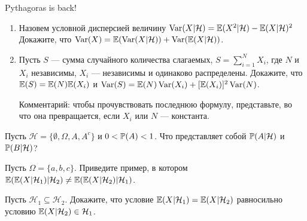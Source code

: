 \begin{problem}
 Pythagoras is back!

\begin{enumerate}
\item  Назовем условной дисперсией величину
$\Var(X|\mathcal{H})=\E(X^{2}|\mathcal{H})-\E(X|\mathcal{H})^{2}$ \\
Докажите, что
$\Var(X)=\E(\Var(X|\mathcal{H}))+\Var(\E(X|\mathcal{H}))$.
\item Пусть $S$ — сумма случайного количества слагаемых,
$S=\sum_{i=1}^{N}X_{i}$, где $N$ и $X_{i}$ независимы, $X_{i}$ — независимы и одинаково распределены.
Докажите, что $\E(S)=\E(N)\E(X_{i})$ и
$\Var(S)=\E(N)\Var(X_{i})+[\E(X_{i})]^{2}\Var(N)$.

Комментарий: чтобы прочувствовать последнюю формулу, представьте,
во что она превращается, если $X_{i}$ или $N$ — константа.
\end{enumerate}


\begin{sol}

\end{sol}
\end{problem}

\begin{problem}
Пусть $\mathcal{H}=\{\emptyset,\Omega,A,A^{c}\}$ и $0<\P(A)<1$. Что
представляет собой $\P(A|\mathcal{H})$ и $\P(B|\mathcal{H})$?

\begin{sol}

\end{sol}
\end{problem}

\begin{problem}
Пусть $\Omega=\{a,b,c\}$. Приведите пример, в котором
$\E(\E(X|\mathcal{H}_{1})|\mathcal{H}_{2})\neq
\E(\E(X|\mathcal{H}_{2})|\mathcal{H}_{1})$.

\begin{sol}

\end{sol}
\end{problem}

\begin{problem}
Пусть $\mathcal{H}_{1} \subseteq \mathcal{H}_{2}$. Докажите, что
условие $\E(X|\mathcal{H}_{1})=\E(X|\mathcal{H}_{2})$ равносильно
условию $\E(X|\mathcal{H}_{2})\in \mathcal{H}_{1}$.

\begin{sol}

\end{sol}
\end{problem}


